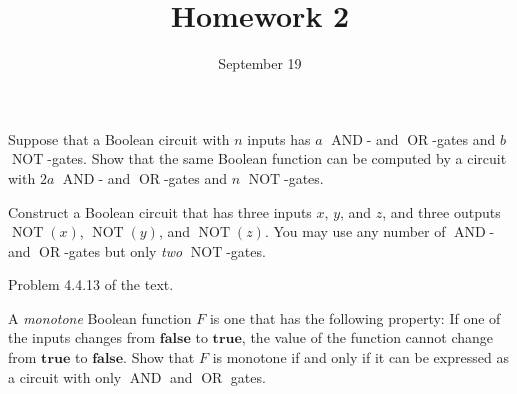 \documentclass{../math167}
\title{Homework 2}
\date{September 19}
\author{}
\newcommand{\NOT}{\operatorname{NOT}}
\newcommand{\AND}{\operatorname{AND}}
\newcommand{\OR}{\operatorname{OR}}
\begin{document}
\begin{problems}
\item Suppose that a Boolean circuit with \(n\) inputs has \(a\)
  \(\AND\)- and \(\OR\)-gates and \(b\) \(\NOT\)-gates.  Show that the
  same Boolean function can be computed by a circuit with \(2a\)
  \(\AND\)- and \(\OR\)-gates and \(n\) \(\NOT\)-gates.

  \begin{solution}
  \end{solution}

\item Construct a Boolean circuit that has three inputs \(x\), \(y\),
  and \(z\), and three outputs \(\NOT(x)\), \(\NOT(y)\), and
  \(\NOT(z)\).  You may use any number of \(\AND\)- and \(\OR\)-gates
  but only \emph{two} \(\NOT\)-gates.

  \begin{solution}
  \end{solution}

\item Problem 4.4.13 of the text.
  \begin{book}
    A \emph{monotone} Boolean function \(F\) is one that has the
    following property: If one of the inputs changes from
    \(\mathbf{false}\) to \(\mathbf{true}\), the value of the function
    cannot change from \(\mathbf{true}\) to \(\mathbf{false}\).  Show
    that \(F\) is monotone if and only if it can be expressed as a
    circuit with only \(\AND\) and \(\OR\) gates.
  \end{book}

  \begin{solution}
  \end{solution}

\end{problems}
\end{document}
